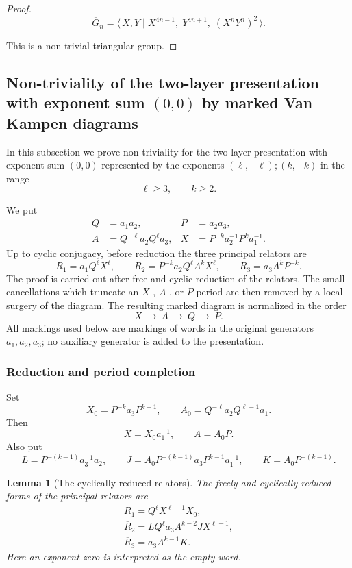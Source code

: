 \documentclass{article}
\newtheorem{lm}[theorem]{Lemma}
\newcommand{\gp}[2]{\langle\, #1 \mid #2 \,\rangle}
\begin{document}
\begin{proof}
\[
\overline G_n=
\gp{X,Y}{
X^{4n-1},\;
Y^{4n+1},\;
(X^nY^n)^2
}.
\]

This is a non-trivial triangular group.
\end{proof}




\subsection{Non-triviality of the two-layer presentation with exponent sum $(0,0)$ by marked Van Kampen diagrams}

In this subsection we prove non-triviality for the two-layer presentation with
exponent sum $(0,0)$ represented by the exponents $(\ell, -\ell); (k,-k)$ in the range
\[
        \ell\geq 3,\qquad k\geq 2.
\]

We put
\[
\begin{aligned}
Q&=a_1a_2,& P&=a_2a_3,\\
A&=Q^{-\ell}a_2Q^{\ell}a_3,&
X&=P^{-k}a_2^{-1}P^ka_1^{-1}.
\end{aligned}
\]
Up to cyclic conjugacy, before reduction the three principal relators are
\[
R_1=a_1Q^{\ell}X^{\ell},\qquad
R_2=P^{-k}a_2Q^{\ell}A^kX^{\ell},\qquad
R_3=a_3A^kP^{-k}.
\]
The proof is carried out after free and cyclic reduction of the relators.  The
small cancellations which truncate an $X$-, $A$-, or $P$-period are then
removed by a local surgery of the diagram.  The resulting marked diagram is
normalized in the order
\[
        \boxed{X\ \longrightarrow\ A\ \longrightarrow\ Q\ \longrightarrow\ P.}
\]
All markings used below are markings of words in the original generators
$a_1,a_2,a_3$; no auxiliary generator is added to the presentation.

\subsubsection*{Reduction and period completion}

Set
\[
        X_0=P^{-k}a_3P^{k-1},
        \qquad
        A_0=Q^{-\ell}a_2Q^{\ell-1}a_1.
\]
Then
\[
        X=X_0a_1^{-1},\qquad A=A_0P.
\]
Also put
\[
L=P^{-(k-1)}a_3^{-1}a_2,\qquad
J=A_0P^{-(k-1)}a_3P^{k-1}a_1^{-1},\qquad
K=A_0P^{-(k-1)}.
\]

\begin{lm}[The cyclically reduced relators]\label{lm:reduced-marked-relators}
The freely and cyclically reduced forms of the principal relators are
\[
\begin{gathered}
\overline R_1=Q^{\ell}X^{\ell-1}X_0,\\[-1pt]
\overline R_2=LQ^{\ell}a_3A^{k-2}JX^{\ell-1},\\[-1pt]
\overline R_3=a_3A^{k-1}K.
\end{gathered}
\]
Here an exponent zero is interpreted as the empty word.
\end{lm}
\end{document}
